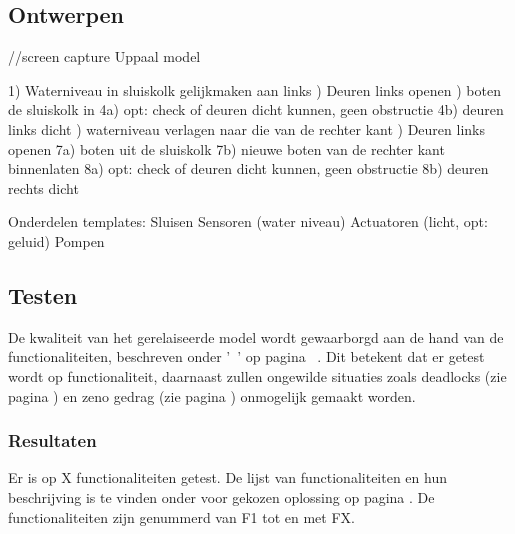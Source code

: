 \documentclass{article}
\begin{document}
\subsection{Ontwerpen}
//screen capture Uppaal model \newline

1) Waterniveau in sluiskolk gelijkmaken aan links ) Deuren links openen ) boten de sluiskolk in \newline
4a) opt: check of deuren dicht kunnen, geen obstructie \newline
4b) deuren links dicht ) waterniveau verlagen naar die van de rechter kant ) Deuren links openen \newline
7a) boten uit de sluiskolk \newline
7b) nieuwe boten van de rechter kant binnenlaten \newline
8a) opt: check of deuren dicht kunnen, geen obstructie \newline
8b) deuren rechts dicht \newline

Onderdelen templates: \newline
Sluisen \newline
Sensoren (water niveau) \newline
Actuatoren (licht, opt: geluid) \newline
Pompen


\subsection{Testen}

De kwaliteit van het gerelaiseerde model wordt gewaarborgd aan de hand van de functionaliteiten, beschreven onder '~' op pagina ~\pageref{sec:FuncList}. Dit betekent dat er getest wordt op functionaliteit, daarnaast zullen ongewilde situaties zoals deadlocks (zie pagina \pageref{deadlock}) en zeno gedrag (zie pagina \pageref{zenobehavior}) onmogelijk gemaakt worden.

\subsubsection{Resultaten}

Er is op X functionaliteiten getest. De lijst van functionaliteiten en hun beschrijving is te vinden onder  voor gekozen oplossing op pagina \pageref{sec:FuncList}. De functionaliteiten zijn genummerd van F1 tot en met FX.
\end{document}
